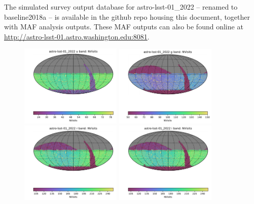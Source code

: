\documentclass[DM,lsstdraft,authoryear,toc]{lsstdoc}
\begin{document}
The simulated survey output database for astro-lsst-01\_2022 -- {\underscore renamed to baseline2018a} -- is available in the github repo housing this document, together with MAF analysis outputs. These MAF outputs can also be found online at \url{http://astro-lsst-01.astro.washington.edu:8081}.


\clearpage
\clearpage

\begin{figure}[ht]
\centering
\includegraphics[width=0.43\textwidth]{figures/astro-lsst-01_2022_NVisits_u_band_HEAL_SkyMap}
\includegraphics[width=0.43\textwidth]{figures/astro-lsst-01_2022_NVisits_g_band_HEAL_SkyMap} \\
\includegraphics[width=0.43\textwidth]{figures/astro-lsst-01_2022_NVisits_r_band_HEAL_SkyMap}
\includegraphics[width=0.43\textwidth]{figures/astro-lsst-01_2022_NVisits_i_band_HEAL_SkyMap} \\

\end{figure}
\end{document}
